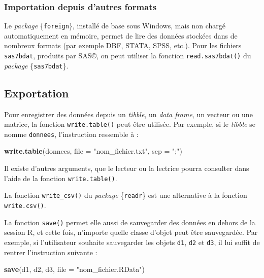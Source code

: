 \documentclass[
  11pt,
]{book}
\newenvironment{Shaded}{\begin{snugshade}}{\end{snugshade}}
\newcommand{\DataTypeTok}[1]{\textcolor[rgb]{0.13,0.29,0.53}{#1}}
\newcommand{\KeywordTok}[1]{\textcolor[rgb]{0.13,0.29,0.53}{\textbf{#1}}}
\newcommand{\NormalTok}[1]{#1}
\newcommand{\StringTok}[1]{\textcolor[rgb]{0.31,0.60,0.02}{#1}}
\numberwithin{equation}{section}
\newcounter{countremarque}
\newenvironment{remarque}{%
 \refstepcounter{countremarque}
    \begin{tcolorbox}[width=\linewidth, colback=blue!3, boxrule=0.5pt,arc=0pt,title = Remarque \thecountremarque]
    }%
    {
    \end{tcolorbox}
    }
\numberwithin{countremarque}{section}
\begin{document}
\hypertarget{importation-depuis-dautres-formats}{%
\subsubsection{Importation depuis d'autres formats}\label{importation-depuis-dautres-formats}}

Le \emph{package} \{\texttt{foreign}\}, installé de base sous Windows, mais non chargé automatiquement en mémoire, permet de lire des données stockées dans de nombreux formats (par exemple DBF, STATA, SPSS, etc.). Pour les fichiers \texttt{sas7bdat}, produits par SAS©, on peut utiliser la fonction \texttt{read.sas7bdat()} du \emph{package} \{\texttt{sas7bdat}\}.

\hypertarget{exportation}{%
\subsection{Exportation}\label{exportation}}

Pour enregistrer des données depuis un \emph{tibble}, un \emph{data frame}, un vecteur ou une matrice, la fonction \texttt{write.table()} peut être utilisée. Par exemple, si le \emph{tibble} se nomme \texttt{donnees}, l'instruction ressemble à :

\begin{Shaded}
\begin{Highlighting}[]
\KeywordTok{write.table}\NormalTok{(donnees, }\DataTypeTok{file =} \StringTok{"nom\_fichier.txt"}\NormalTok{, }\DataTypeTok{sep =} \StringTok{";"}\NormalTok{)}
\end{Highlighting}
\end{Shaded}

Il existe d'autres arguments, que le lecteur ou la lectrice pourra consulter dans l'aide de la fonction \texttt{write.table()}.

\begin{remarque}
La fonction \texttt{write\_csv()} du \emph{package} \{\texttt{readr}\} est une alternative à la fonction \texttt{write.csv()}.
\end{remarque}

La fonction \texttt{save()} permet elle aussi de sauvegarder des données en dehors de la session R, et cette fois, n'importe quelle classe d'objet peut être sauvegardée. Par exemple, si l'utilisateur souhaite sauvegarder les objets \texttt{d1}, \texttt{d2} et \texttt{d3}, il lui suffit de rentrer l'instruction suivante :

\begin{Shaded}
\begin{Highlighting}[]
\KeywordTok{save}\NormalTok{(d1, d2, d3, }\DataTypeTok{file =} \StringTok{"nom\_fichier.RData"}\NormalTok{)}
\end{Highlighting}
\end{Shaded}
\end{document}
